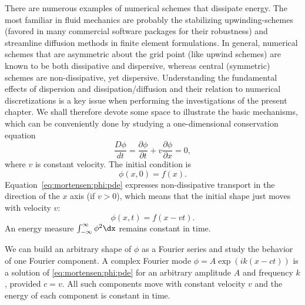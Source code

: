 There are numerous examples of numerical schemes that dissipate
energy. The most familiar in fluid mechanics are probably the stabilizing
upwinding-schemes (favored in many commercial software packages for
their robustness) and streamline diffusion methods in finite element
formulations. In general, numerical schemes that are asymmetric about
the grid point (like upwind schemes) are known to be both dissipative
and dispersive, whereas central (symmetric) schemes are non-dissipative,
yet dispersive. Understanding the fundamental effects of dispersion and
dissipation/diffusion and their relation to numerical discretizations is
a key issue when performing the investigations of the present chapter. We
shall therefore devote some space to illustrate the basic mechanisms,
which can be conveniently done by studying a one-dimensional conservation
equation
\begin{equation}
\frac{D\phi}{dt}
 = \frac{\partial\phi}{\partial t} + v\frac{\partial\phi}{\partial x}
  = 0,
\label{eq:mortensen:phi:pde}
\end{equation}
where $v$ is constant velocity. The initial condition is
\begin{equation}
  \phi(x,0)=f(x).
\end{equation}
Equation~\eqref{eq:mortensen:phi:pde} expresses non-dissipative transport
in the direction of the $x$ axis (if $v>0$), which means that the initial
shape just moves with velocity $v$:
\begin{equation}
 \phi(x,t) = f(x-vt).
\end{equation}
An energy measure $\int_{-\infty}^\infty\phi^2\dx$ remains constant
in time.

We can build an arbitrary shape of $\phi$ as a Fourier series and study
the behavior of one Fourier component.  A complex Fourier mode $\phi
= A\exp{(ik(x - ct))}$ is a solution of \eqref{eq:mortensen:phi:pde}
for an arbitrary amplitude $A$ and frequency $k$, provided $c = v$.
All such components move with constant velocity $v$ and the energy of
each component is constant in time.

